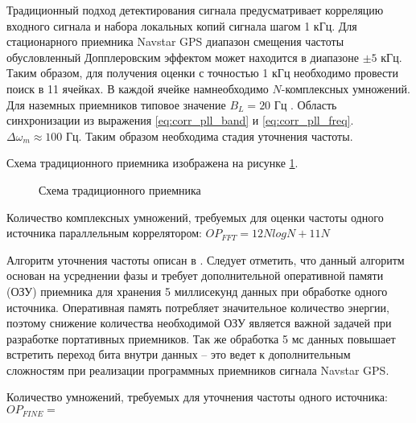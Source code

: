 Традиционный подход детектирования сигнала предусматривает корреляцию входного сигнала и набора локальных копий сигнала шагом 1 кГц.
Для стационарного приемника Navstar GPS диапазон смещения частоты обусловленный Допплеровским эффектом \cite{tsui} может находится в диапазоне ${\pm 5}$ кГц.
Таким образом, для получения оценки с точностью 1 кГц необходимо провести поиск в 11 ячейках. В каждой ячейке намнеобходимо ${N}$-комплексных умножений.
Для наземных приемников типовое значение  ${B_L=20}$ Гц \cite{tsui, akos-book}. Область синхронизации из выражения \ref{eq:corr_pll_band} и  \ref{eq:corr_pll_freq}.
${\Delta \omega_m \approx 100}$ Гц. Таким образом необходима стадия уточнения частоты.

Схема традиционного приемника изображена на рисунке \ref{pic:corr_scheme}.
\begin{figure}[H]
	\center{}
	\caption{Схема традиционного приемника}
	\label{pic:corr_scheme}
\end{figure}

Количество комплексных умножений, требуемых для оценки частоты одного источника параллельным коррелятором: ${OP_{FFT} = 12NlogN + 11N}$

Алгоритм уточнения частоты описан в \cite{tsui}. Следует отметить, что данный алгоритм основан на усреднении фазы и требует дополнительной оперативной памяти
(ОЗУ) приемника для хранения 5 миллисекунд данных при обработке одного источника. Оперативная память потребляет значительное количество энергии,
поэтому снижение количества необходимой ОЗУ является важной задачей при разработке портативных приемников.
Так же обработка 5 мс данных повышает встретить переход бита внутри данных – это ведет к дополнительным сложностям при реализации программных приемников сигнала Navstar GPS.

Количество умножений, требуемых для уточнения частоты одного источника: ${OP_{FINE} = }$

\newpage

